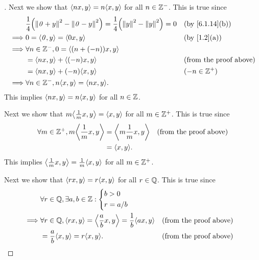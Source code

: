 \begin{proof}[]
  Next we show that \(\inn{nx, y} = n \inn{x, y}\) for all \(n \in \mathbb{Z}^-\).
  This is true since
  \begin{align*}
             & \frac{1}{4} \pa{\norm{\zv + y}^2 - \norm{\zv - y}^2} = \frac{1}{4} \pa{\norm{y}^2 - \norm{y}^2} = 0 &  & \text{(by \cref{6.1.14}(b))}  \\
    \implies & 0 = \inn{\zv, y} = \inn{0x, y}                                                                      &  & \text{(by \cref{1.2}(a))}     \\
    \implies & \forall n \in \Z^-, 0 = \inn{(n + (-n)) x, y}                                                                                          \\
             & = \inn{nx, y} + \inn{(-n)x, y}                                                                      &  & \text{(from the proof above)} \\
             & = \inn{nx, y} + (-n) \inn{x, y}                                                                     &  & (-n \in \Z^+)                 \\
    \implies & \forall n \in \Z^-, n \inn{x, y} = \inn{nx, y}.
  \end{align*}
  This implies \(\inn{nx, y} = n \inn{x, y}\) for all \(n \in \mathbb{Z}\).

  Next we show that \(m \inn{\frac{1}{m} x, y} = \inn{x, y}\) for all \(m \in \mathbb{Z}^+\).
  This is true since
  \begin{align*}
    \forall m \in \Z^+, m \inn{\frac{1}{m} x, y} & = \inn{m \frac{1}{m} x, y} &  & \text{(from the proof above)} \\
                                                 & = \inn{x, y}.
  \end{align*}
  This implies \(\inn{\frac{1}{m} x, y} = \frac{1}{m} \inn{x, y}\) for all \(m \in \mathbb{Z}^+\).

  Next we show that \(\inn{rx, y} = r \inn{x, y}\) for all \(r \in \mathbb{Q}\).
  This is true since
  \begin{align*}
             & \forall r \in \Q, \exists a, b \in \Z : \begin{dcases}
                                                         b > 0 \\
                                                         r = a / b
                                                       \end{dcases}                                                               \\
    \implies & \forall r \in \Q, \inn{rx, y} = \inn{\frac{a}{b} x, y} = \frac{1}{b} \inn{ax, y} &  & \text{(from the proof above)} \\
             & = \frac{a}{b} \inn{x, y} = r \inn{x, y}.                                         &  & \text{(from the proof above)}
  \end{align*}


\end{proof}
